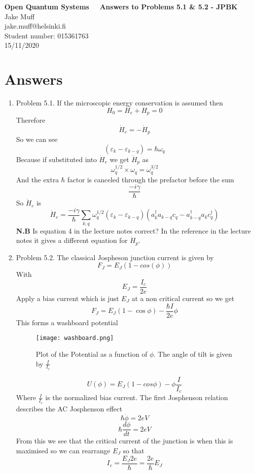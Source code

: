 \documentclass[12pt]{article}
\begin{document}
\normalsize

\baselineskip 14pt

\begin{center}
{\Large {\bf Open Quantum Systems \ \  Answers to Problems 5.1 \& 5.2 - JPBK }}\\
{\large { Jake Muff}}\\
jake.muff@helsinki.fi \\
{Student number: 015361763}\\
{15/11/2020}
\end{center}


\section{Answers}
\begin{enumerate}
    \item Problem 5.1. If the microscopic energy conservation is assumed then 
    $$ H_0 = H_e + H_p = 0 $$
    Therefore 
    $$ \dot{H}_e = - \dot{H}_p $$
    So we can see 
    $$ ( \varepsilon_k - \varepsilon_{k-q}) = \hbar \omega_q $$
    Because if substituted into $\dot{H}_e$ we get $\dot{H}_p$ as
    $$ \omega_q^{1/2} \times \omega_q = \omega_q^{3/2} $$
    And the extra $\hbar$ factor is canceled through the prefactor before the sum 
    $$ \frac{-i \gamma}{\hbar} $$
    So $\dot{H}_e$ is 
    $$ \dot{H}_e = \frac{-i \gamma}{\hbar} \sum_{k,q} \omega_q^{1/2} ( \varepsilon_k - \varepsilon_{k-q} ) (a^{\dagger}_k a_{k-q} c_q - a^{\dagger}_{k-q} a_k c_q^{\dagger} ) $$
    \textbf{N.B} Is equation 4 in the lecture notes correct? In the reference in the lecture notes it gives a different equation for $\dot{H}_p$. 


    \item Problem 5.2. The classical Jospheson junction current is given by 
    $$ F_J = E_J (1- cos(\phi)) $$
    With 
    $$ E_J = \frac{I_c}{2e} $$
    Apply a bias current which is just $E_J$ at a non critical current so we get 
    $$ F_J = E_J (1 - \cos \phi) - \frac{\hbar I}{2e} \phi $$
    This forms a washboard potential 

    \begin{figure}[h]
        \texttt{[image: washboard.png]}
        \centering
        \caption{Plot of the Potential as a function of $\phi$. The angle of tilt is given by $\frac{I}{I_c}$}
    \end{figure}
    $$ U(\phi) = E_J (1-cos \phi) - \phi \frac{I}{I_c} $$
    Where $ \frac{I}{I_c}$ is the normalized bias current. The first Josphenson relation describes the AC Josphenson effect 
    $$ \hbar \dot{\phi} = 2eV $$
    $$ \hbar \frac{d \phi}{dt} = 2eV $$
    From this we see that the critical current of the junction is when this is maximised so we can rearrange $E_J$ so that 
    $$ I_c = \frac{E_J 2e}{\hbar} = \frac{2e}{\hbar} E_J $$



\end{enumerate}
\end{document}
